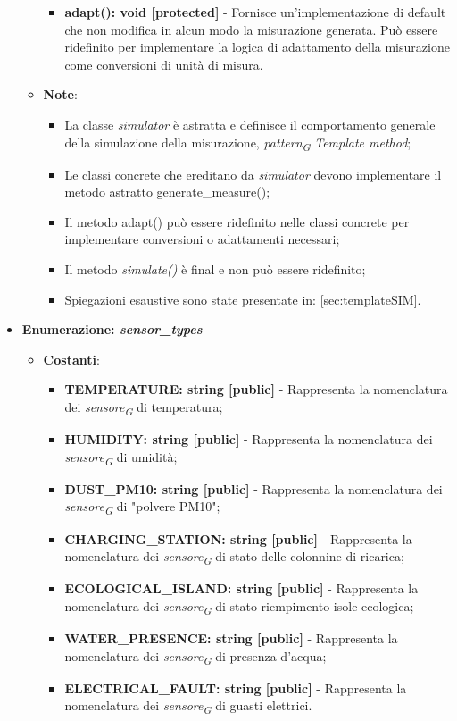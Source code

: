 \begin{itemize}
\begin{itemize}
\begin{itemize}
            \item \textbf{adapt(): void [protected]} - Fornisce un'implementazione di default che non modifica in alcun modo la misurazione generata. Può essere ridefinito per implementare la logica di adattamento della misurazione come conversioni di unità di misura.
        \end{itemize}
        \item \textbf{Note}:
        \begin{itemize}
            \item La classe \textit{simulator} è astratta e definisce il comportamento generale della simulazione della misurazione, \textit{pattern}\textsubscript{\textit{G}} \textit{Template method};
            \item Le classi concrete che ereditano da \textit{simulator} devono implementare il metodo astratto generate\_measure();
            \item Il metodo adapt() può essere ridefinito nelle classi concrete per implementare conversioni o adattamenti necessari;
            \item Il metodo \textit{simulate()} è final e non può essere ridefinito;
            \item Spiegazioni esaustive sono state presentate in: \ref{sec:templateSIM}.
        \end{itemize}
    \end{itemize}
        
    \item{\textbf{Enumerazione: \textit{sensor\_types}}}
    \begin{itemize}
        \item \textbf{Costanti}: 
        \begin{itemize}
            \item \textbf{TEMPERATURE: string [public]} - Rappresenta la nomenclatura dei \textit{sensore}\textsubscript{\textit{G}} di temperatura;
            \item \textbf{HUMIDITY: string [public]} - Rappresenta la nomenclatura dei \textit{sensore}\textsubscript{\textit{G}} di umidità;
            \item \textbf{DUST\_PM10: string [public]} - Rappresenta la nomenclatura dei \textit{sensore}\textsubscript{\textit{G}} di "polvere PM10";
            \item \textbf{CHARGING\_STATION: string [public]} - Rappresenta la nomenclatura dei \textit{sensore}\textsubscript{\textit{G}} di stato delle colonnine di ricarica;
            \item \textbf{ECOLOGICAL\_ISLAND: string [public]} - Rappresenta la nomenclatura dei \textit{sensore}\textsubscript{\textit{G}} di stato riempimento isole ecologica;
            \item \textbf{WATER\_PRESENCE: string [public]} - Rappresenta la nomenclatura dei \textit{sensore}\textsubscript{\textit{G}} di presenza d'acqua;
            \item \textbf{ELECTRICAL\_FAULT: string [public]} - Rappresenta la nomenclatura dei \textit{sensore}\textsubscript{\textit{G}} di guasti elettrici.
        \end{itemize}


\end{itemize}
\end{itemize}
